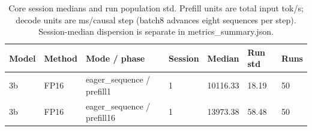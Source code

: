 \begin{table}[t]
\centering
\small
\caption{Core session medians and run population std. Prefill units are total input tok/s; decode units are ms/causal step (batch8 advances eight sequences per step). Session-median dispersion is separate in metrics\_summary.json.}
\begin{tabular}{lllllll}
\toprule
Model & Method & Mode / phase & Session & Median & Run std & Runs \\
\midrule
3b & FP16 & eager\_sequence / prefill1 & 1 & 10116.33 & 18.19 & 50 \\
3b & FP16 & eager\_sequence / prefill16 & 1 & 13973.38 & 58.48 & 50 \\
\bottomrule
\end{tabular}
\end{table}
